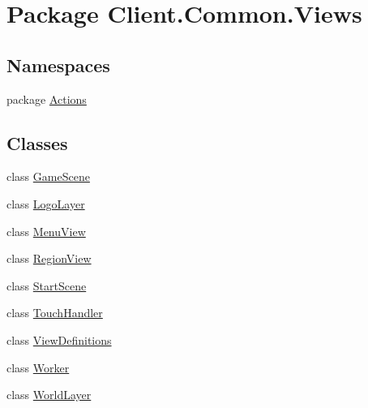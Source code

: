 \hypertarget{namespaceClient_1_1Common_1_1Views}{\section{Package Client.\-Common.\-Views}
\label{namespaceClient_1_1Common_1_1Views}
}
\subsection*{Namespaces}
\begin{DoxyCompactItemize}
\item 
package \hyperlink{namespaceClient_1_1Common_1_1Views_1_1Actions}{Actions}
\end{DoxyCompactItemize}
\subsection*{Classes}
\begin{DoxyCompactItemize}
\item 
class \hyperlink{classClient_1_1Common_1_1Views_1_1GameScene}{Game\-Scene}
\item 
class \hyperlink{classClient_1_1Common_1_1Views_1_1LogoLayer}{Logo\-Layer}
\item 
class \hyperlink{classClient_1_1Common_1_1Views_1_1MenuView}{Menu\-View}
\item 
class \hyperlink{classClient_1_1Common_1_1Views_1_1RegionView}{Region\-View}
\item 
class \hyperlink{classClient_1_1Common_1_1Views_1_1StartScene}{Start\-Scene}
\item 
class \hyperlink{classClient_1_1Common_1_1Views_1_1TouchHandler}{Touch\-Handler}
\item 
class \hyperlink{classClient_1_1Common_1_1Views_1_1ViewDefinitions}{View\-Definitions}
\item 
class \hyperlink{classClient_1_1Common_1_1Views_1_1Worker}{Worker}
\item 
class \hyperlink{classClient_1_1Common_1_1Views_1_1WorldLayer}{World\-Layer}
\end{DoxyCompactItemize}
